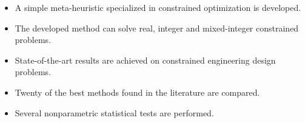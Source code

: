 \documentclass{article}
\begin{document}
\begin{itemize}

\item A simple meta-heuristic specialized in constrained optimization is developed.

\item The developed method can solve real, integer and mixed-integer constrained problems.

\item State-of-the-art results are achieved on constrained engineering design problems.

\item Twenty of the best methods found in the literature are compared.

\item Several nonparametric statistical tests are performed.


\end{itemize}
\end{document}
